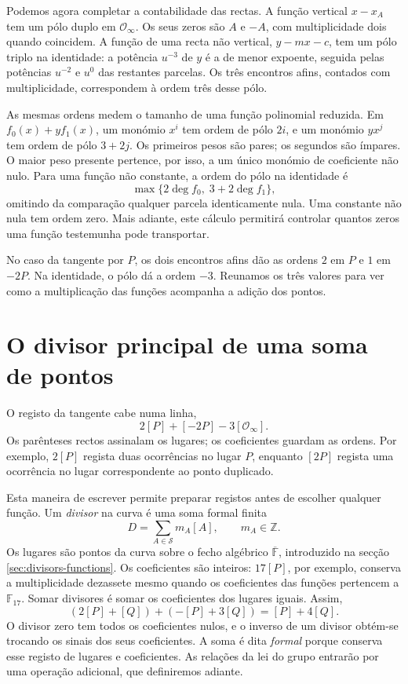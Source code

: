 Podemos agora completar a contabilidade das rectas. A função vertical
\(x-x_A\) tem um pólo duplo em \(\mathcal O_\infty\). Os seus
zeros são \(A\) e \(-A\), com multiplicidade dois quando coincidem.
A função de uma recta não vertical, \(y-mx-c\), tem um pólo triplo
na identidade: a potência \(u^{-3}\) de \(y\) é a de menor expoente,
seguida pelas potências \(u^{-2}\) e \(u^0\) das restantes parcelas.
Os três encontros afins, contados com multiplicidade, correspondem à
ordem três desse pólo.

As mesmas ordens medem o tamanho de uma função polinomial reduzida.
Em \(f_0(x)+yf_1(x)\), um monómio \(x^i\) tem ordem de pólo
\(2i\), e um monómio \(yx^j\) tem ordem de pólo \(3+2j\).
Os primeiros pesos são pares; os segundos são ímpares. O maior peso
presente pertence, por isso, a um único monómio de coeficiente não nulo.
Para uma função não constante, a ordem do pólo na identidade é
\[
 \max\{2\deg f_0,\;3+2\deg f_1\},
\]
omitindo da comparação qualquer parcela identicamente nula. Uma
constante não nula tem ordem zero. Mais adiante, este cálculo permitirá
controlar quantos zeros uma função testemunha pode transportar.

No caso da tangente por \(P\), os dois encontros afins dão as
ordens \(2\) em \(P\) e \(1\) em \(-2P\). Na identidade, o pólo
dá a ordem \(-3\). Reunamos os três valores para ver como a
multiplicação das funções acompanha a adição dos pontos.

\section{O divisor principal de uma soma de pontos}
\label{sec:divisors-ledger}

O registo da tangente cabe numa linha,
\[
 2[P]+[-2P]-3[\mathcal O_\infty].
\]
Os parênteses rectos assinalam os lugares;
os coeficientes guardam as ordens. Por exemplo, \(2[P]\) regista duas
ocorrências no lugar \(P\), enquanto \([2P]\) regista uma ocorrência
no lugar correspondente ao ponto duplicado.

Esta maneira de escrever permite preparar registos antes de escolher
qualquer função. Um \emph{divisor} na curva é uma soma formal finita
\begin{equation}
 D=\sum_{A\in\mathcal S}m_A[A],\qquad m_A\in\mathbb Z.
 \label{eq:fcmp-formal-divisor}
\end{equation}
Os lugares são pontos da curva sobre o fecho algébrico
\(\overline{\mathbb F}\), introduzido na secção
\ref{sec:divisors-functions}. Os coeficientes são inteiros:
\(17[P]\), por exemplo, conserva a multiplicidade dezassete mesmo
quando os coeficientes das funções pertencem a \(\mathbb F_{17}\).
Somar divisores é somar os coeficientes dos lugares iguais. Assim,
\[
 (2[P]+[Q])+(-[P]+3[Q])=[P]+4[Q].
\]
O divisor zero tem todos os coeficientes nulos, e o inverso de um
divisor obtém-se trocando os sinais dos seus coeficientes.
A soma é dita \emph{formal} porque conserva esse registo de lugares e
coeficientes. As relações da lei do grupo entrarão por uma operação
adicional, que definiremos adiante.

